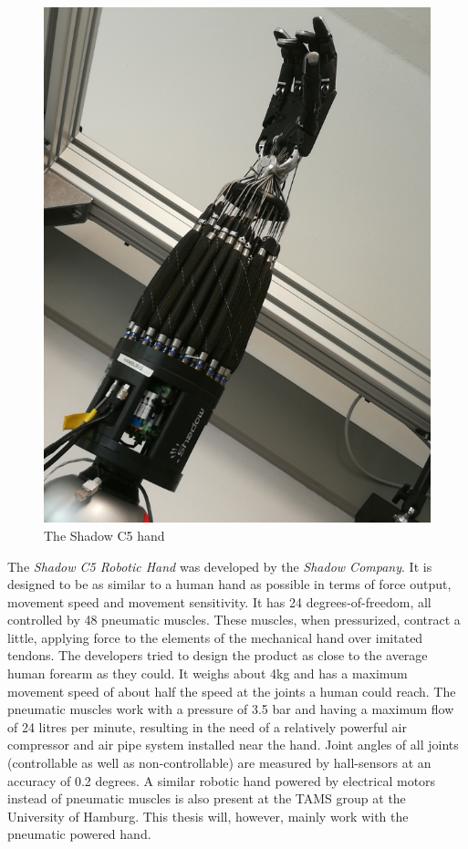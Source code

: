 \begin{figure}
	\caption{The Shadow C5 hand}
	\includegraphics[width=\linewidth]{assets/chpt_basics/hand.png}
\end{figure}

The \textit{Shadow C5 Robotic Hand} was developed by the \textit{Shadow Company}. It is designed to be as similar to a human hand as possible\cite{web:robothand:spec} in terms of force output, movement speed and movement sensitivity. It has 24 degrees-of-freedom, all controlled by 48 pneumatic muscles. These muscles, when pressurized, contract a little, applying force to the elements of the mechanical hand over imitated tendons. The developers tried to design the product as close to the average human forearm as they could. It weighs about 4kg and has a maximum movement speed of about half the speed at the joints a human could reach. The pneumatic muscles work with a pressure of 3.5 bar and having a maximum flow of 24 litres per minute, resulting in the need of a relatively powerful air compressor and air pipe system installed near the hand. Joint angles of all joints (controllable as well as non-controllable) are measured by hall-sensors at an accuracy of 0.2 degrees.
A similar robotic hand powered by electrical motors instead of pneumatic muscles is also present at the TAMS group at the University of Hamburg. This thesis will, however, mainly work with the pneumatic powered hand. 
\newpage
